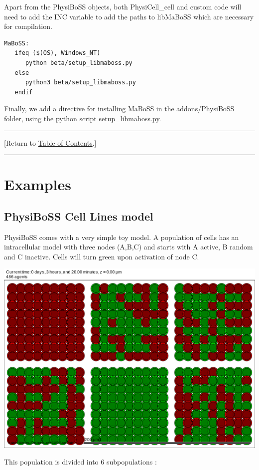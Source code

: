 \documentclass[12pt]{article}
\newcommand{\TOClink}{\begin{center}\hrule\vskip-5pt\phantom{.}\hfill[Return to \hyperlink{TOC}{Table of Contents}.]\hfill\phantom{.}\vskip3pt\hrule\end{center}}
\begin{document}
Apart from the PhysiBoSS objects, both PhysiCell\_cell and custom code will need to add the INC variable to add the paths to libMaBoSS which are necessary for compilation. 
\begin{verbatim}
MaBoSS: 
   ifeq ($(OS), Windows_NT)
      python beta/setup_libmaboss.py
   else
      python3 beta/setup_libmaboss.py
   endif
\end{verbatim}

Finally, we add a directive for installing MaBoSS in the addons/PhysiBoSS folder, using the python script setup\_libmaboss.py. 
\TOClink
 \pagebreak 

\section{Examples}
\label{sec:Examples}

\subsection{PhysiBoSS Cell Lines model}

PhysiBoSS comes with a very simple toy model. A population of cells has an intracellular model with three nodes (A,B,C) and starts with A active, B random and C inactive. Cells will turn green upon activation of node C.\\
\begin{center}
	\includegraphics{images/physiboss_cell_lines_example.png}
\end{center}

This population is divided into 6 subpopulations : 
\end{document}
